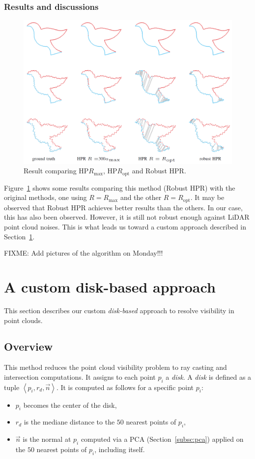 \subsubsection{Results and discussions}
\begin{figure}
  \centering
  \includegraphics[scale=0.35]{img/rhpr-result.png}
  \caption{Result comparing HP$R_\text{max}$, HP$R_\text{opt}$ and Robust HPR.}
  \label{fig:rhpr-result}
\end{figure}

Figure~\ref{fig:rhpr-result} shows some results comparing this method (Robust HPR) with the original methods, one using $R = R_\text{max}$ and the other $R = R_\text{opt}$. It may be observed that Robust HPR achieves better results than the others. In our case, this has also been observed. However, it is still not robust enough against LiDAR point cloud noises. This is what leads us toward a custom approach described in Section~\ref{sc:custom}.

FIXME: Add pictures of the algorithm on Monday!!!

\section{A custom disk-based approach}
\label{sc:custom}
This section describes our custom \emph{disk-based} approach to resolve visibility in point clouds.

\subsection{Overview}
\label{subsc:custom-overview}
This method reduces the point cloud visibility problem to ray casting and intersection computations. It assigns to each point $p_i$ a \emph{disk}. A \emph{disk} is defined as a tuple $\left\langle p_i, r_d, \vec{n} \right\rangle$. It is computed as follows for a specific point $p_i$:
\begin{itemize}
  \item $p_i$ becomes the center of the disk,
  \item $r_d$ is the mediane distance to the $50$ nearest points of $p_i$,
  \item $\vec{n}$ is the normal at $p_i$ computed via a PCA (Section~\ref{subsc:pca}) applied on the $50$ nearest points of $p_i$, including itself.
\end{itemize}

